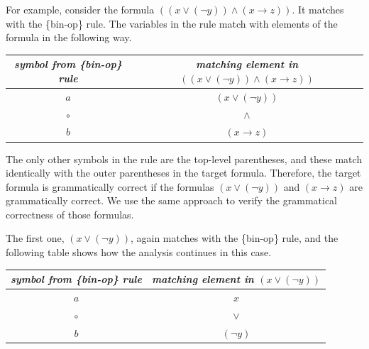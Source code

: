 For example, consider the formula
$((x \vee (\neg y)) \wedge (x \rightarrow z))$.
It matches with the \{bin-op\} rule.
The variables in the rule match
with elements of the formula in the following way.

\vspace{2mm}
\begin{minipage}{\textwidth}
\begin{center}
\begin{tabular}{cc}
\hline
\emph{symbol from \{bin-op\} rule}      & \emph{matching element in} $((x \vee (\neg y)) \wedge (x \rightarrow z))$ \\
\hline
$a$                                     & $(x \vee (\neg y))$ \\
$\circ$                                 & $\wedge$ \\
$b$                                     & $(x \rightarrow z)$ \\
\end{tabular}
\end{center}
\end{minipage}
\vspace{1mm}

The only other symbols in the rule are the top-level parentheses, and these match identically with the outer parentheses in the target formula. Therefore, the target formula is grammatically correct if the formulas $(x \vee (\neg y))$ and $(x \rightarrow z)$  are grammatically correct. We use the same approach to verify the grammatical correctness of those formulas.

The first one, $(x \vee (\neg y))$,
again matches with the \{bin-op\} rule,
and the following table shows how the analysis continues in this case.

\vspace{2mm}
\begin{minipage}{\textwidth}
\begin{center}
\begin{tabular}{cc}
\hline
\emph{symbol from \{bin-op\} rule}      & \emph{matching element in}  $(x \vee (\neg y))$ \\
\hline
$a$                                     & $x$ \\
$\circ$                                 & $\vee$ \\
$b$                                     & $(\neg y)$ \\
\end{tabular}
\end{center}
\end{minipage}
\vspace{1mm}

